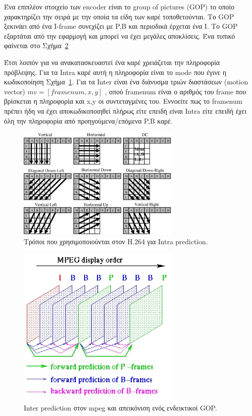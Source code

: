 \indent Ένα επιπλέον στοιχείο των encoder είναι το group of pictures (GOP) το οποίο χαρακτηρίζει την σειρά με την οποία τα είδη των καρέ τοποθετούνται. Το GOP ξεκινάει από ένα I-frame συνεχίζει με P,B και περιοδικά έρχεται ένα Ι. Το GOP εξαρτάται από την εφαρμογή και μπορεί να έχει μεγάλες αποκλίσεις. Ένα τυπικό φαίνεται στο Σχήμα~\ref{fig:gop}

\indent Έτσι λοιπόν για να ανακατασκευαστεί ένα καρέ χρειάζεται την πληροφορία πρόβλεψης. Για τα Intra καρέ αυτή η πληροφορία είναι το mode που έγινε η κωδικοποίηση Σχήμα~\ref{fig:intrapred}. Για τα Inter είναι ένα διάνυσμα τριών διαστάσεων (motion vector) $mv = [ framenum , x , y]$ ,  οπού framenum είναι ο αριθμός του frame που βρίσκεται η πληροφορία και x,y οι συντεταγμένες του. Εννοείτε πως το framenum πρέπει ήδη να έχει αποκωδικοποιηθεί πλήρως είτε επειδή είναι Intra είτε επειδή έχει όλη την πληροφορία από προηγούμενα/επόμενα P,B καρέ.

\begin{figure}[H]
  \centering
    \includegraphics[width=0.7\textwidth]{chapter2/intrapred.jpg}
  \caption{Τρόποι που χρησιμοποιούνται στον Η.264 για Intra prediction. \cite{intrapred}}
    \label{fig:intrapred}
\end{figure}

\begin{figure}[H]
  \centering
    \includegraphics[width=0.7\textwidth]{chapter2/gop.jpg}
  \caption{Inter prediction στον mpeg και απεικόνιση ενός ενδεικτικοί GOP. \cite{misc:gop}}
  \label{fig:gop}
\end{figure}


